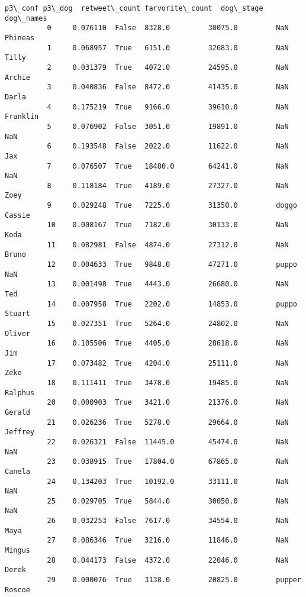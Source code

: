 \documentclass[11pt]{article}
\begin{document}
\begin{Verbatim}[commandchars=\\\{\}]
                 p3\_conf p3\_dog  retweet\_count farvorite\_count  dog\_stage  dog\_names  
          0     0.076110  False  8328.0         38075.0         NaN        Phineas    
          1     0.068957  True   6151.0         32683.0         NaN        Tilly      
          2     0.031379  True   4072.0         24595.0         NaN        Archie     
          3     0.040836  False  8472.0         41435.0         NaN        Darla      
          4     0.175219  True   9166.0         39610.0         NaN        Franklin   
          5     0.076902  False  3051.0         19891.0         NaN        NaN        
          6     0.193548  False  2022.0         11622.0         NaN        Jax        
          7     0.076507  True   18480.0        64241.0         NaN        NaN        
          8     0.118184  True   4189.0         27327.0         NaN        Zoey       
          9     0.029248  True   7225.0         31350.0         doggo      Cassie     
          10    0.008167  True   7182.0         30133.0         NaN        Koda       
          11    0.082981  False  4874.0         27312.0         NaN        Bruno      
          12    0.004633  True   9848.0         47271.0         puppo      NaN        
          13    0.001498  True   4443.0         26680.0         NaN        Ted        
          14    0.007958  True   2202.0         14853.0         puppo      Stuart     
          15    0.027351  True   5264.0         24802.0         NaN        Oliver     
          16    0.105506  True   4405.0         28618.0         NaN        Jim        
          17    0.073482  True   4204.0         25111.0         NaN        Zeke       
          18    0.111411  True   3478.0         19485.0         NaN        Ralphus    
          20    0.000903  True   3421.0         21376.0         NaN        Gerald     
          21    0.026236  True   5278.0         29664.0         NaN        Jeffrey    
          22    0.026321  False  11445.0        45474.0         NaN        NaN        
          23    0.038915  True   17804.0        67865.0         NaN        Canela     
          24    0.134203  True   10192.0        33111.0         NaN        NaN        
          25    0.029705  True   5844.0         30050.0         NaN        NaN        
          26    0.032253  False  7617.0         34554.0         NaN        Maya       
          27    0.086346  True   3216.0         11846.0         NaN        Mingus     
          28    0.044173  False  4372.0         22046.0         NaN        Derek      
          29    0.000076  True   3138.0         20825.0         pupper     Roscoe     

\end{Verbatim}
\end{document}
